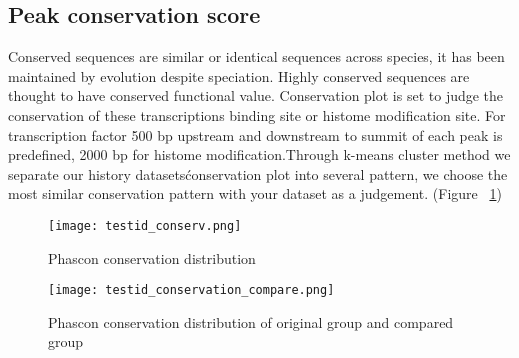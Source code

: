 \documentclass[11pt,a4paper]{article}
\begin{document}
\subsection{Peak conservation score} 
Conserved sequences are similar or identical sequences across species, it has been maintained by evolution despite speciation. Highly conserved sequences are thought to have conserved functional value. Conservation plot is set to judge the conservation of these transcriptions binding site or histome modification site. For transcription factor 500 bp upstream and downstream to summit of each peak is predefined, 2000 bp for histome modification.Through k-means cluster method we separate our history datasets\' conservation plot into several pattern, we choose the most similar conservation pattern with your dataset as a judgement.     (Figure ~\ref{fig:conservation}) \newline
\begin{figure}[h] 
        \caption{Phascon conservation distribution} \label{fig:conservation}
        \setlength{\abovecaptionskip}{0pt} 
        \setlength{\belowcaptionskip}{10pt}
        \centering
        {\texttt{[image: testid\_conserv.png]}}
\end{figure}
\begin{figure}[h] 
        \caption{Phascon conservation distribution of original group and compared group} \label{fig:conservation_compare}
        \setlength{\abovecaptionskip}{0pt} 
        \setlength{\belowcaptionskip}{10pt}
        \centering
        {\texttt{[image: testid\_conservation\_compare.png]}}
\end{figure}
\newpage
\end{document}
